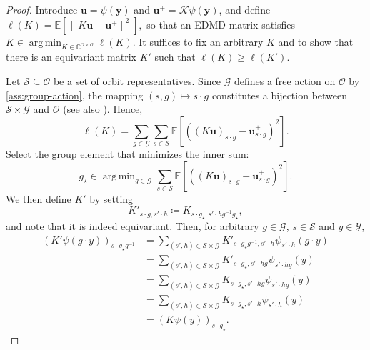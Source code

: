 \documentclass[preprint,12pt,authoryear]{elsarticle}
\newcommand{\C}{\mathbb{C}}
\DeclareMathOperator*{\argmin}{arg\,min}
\newcommand{\lossfull}{\ell}
\newcommand\Kc{\mathcal K}
\newcommand\Gc{\mathcal G}
\newcommand\Oc{\mathcal O}
\newcommand\Yc{\mathcal Y}
\newcommand\Sc{\mathcal S}
\newcommand\Koopman{\Kc}
\begin{document}
{\begin{proof}
    Introduce $\bm u = \psi(\bm y)$ and $\bm u^+ = \Koopman \psi(\bm y) $, and define 
    $
        \lossfull(K) = \mathbb E[\lVert K \bm u - \bm u^+ \rVert^2],
    $
    so that an EDMD matrix satisfies $K \in \argmin_{K \in \C^{\Oc\times \Oc}} \ell(K)$.
    It suffices to fix an arbitrary $K$ and to show that there is an equivariant matrix $K'$ such that $\lossfull(K) \geq \lossfull(K')$. 
    
    Let $\Sc \subseteq \Oc$ be a set of orbit representatives.
    Since $\Gc$ defines a free action on $\Oc$ by \ref{ass:group-action}, the mapping $(s,g) \mapsto s \cdot g$ constitutes a bijection between $\Sc \times \Gc$ and $\Oc$ (see also ). Hence,
    \begin{equation}
        \lossfull(K)
        = \sum_{g \in \Gc} \sum_{s \in \Sc} \mathbb E [( (K \bm u)_{s \cdot g} - \bm u^+_{s \cdot g} )^2].
        \label{eq:thr-convolution-optimality-lossfull}
    \end{equation}
    Select the group element that minimizes the inner sum:
    $$
        g_\star \in \argmin_{g \in \Gc} \sum_{s \in \Sc} \mathbb E [( (K \bm u)_{s \cdot g} - \bm u^+_{s \cdot g} )^2].
    $$
    We then define $K'$ by setting
    $$
        K'_{s \cdot g,s' \cdot h} \coloneqq K_{s \cdot g_\star, s' \cdot h g^{-1} g_\star},
    $$
    and note that it is indeed equivariant.
    Then, for arbitrary $g \in \Gc$, $s \in \Sc$ and $y \in \Yc$,
    \begin{align}
        (K' \psi(g \cdot y))_{s \cdot g_\star g^{-1}}
        &= \textstyle\sum_{(s',h) \in \Sc \times \Gc} 
            K'_{s \cdot g_\star g^{-1}, s' \cdot h} \psi_{s' \cdot h}(g \cdot y) 
            \nonumber \\
        &= \textstyle\sum_{(s',h) \in \Sc \times \Gc} 
            K'_{s \cdot g_\star, s' \cdot h g} \psi_{s' \cdot h g}(y) 
            \label{eq:thr-convolution-optimality-1} \\
        &= \textstyle\sum_{(s',h) \in \Sc \times \Gc} 
            K_{s \cdot g_\star, s' \cdot h g} \psi_{s' \cdot h g}(y) 
            \label{eq:thr-convolution-optimality-2} \\
        &= \textstyle\sum_{(s',h) \in \Sc \times \Gc} 
            K_{s \cdot g_\star, s' \cdot h} \psi_{s' \cdot h}(y) 
            \label{eq:thr-convolution-optimality-3} \\
        &= (K \psi(y))_{s \cdot g_\star}.
            \label{eq:thr-convolution-optimality-4}
    \end{align}

\end{proof}}
\end{document}

